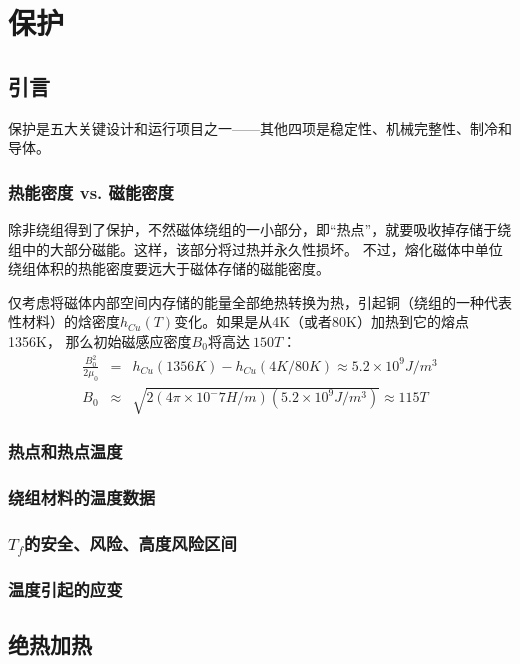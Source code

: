 \chapter{保护}
\section{引言}
保护是五大关键设计和运行项目之一——其他四项是稳定性、机械完整性、制冷和导体。
\subsection{热能密度 vs. 磁能密度}
除非绕组得到了保护，不然磁体绕组的一小部分，即“热点”，就要吸收掉存储于绕组中的大部分磁能。这样，该部分将过热并永久性损坏。
不过，熔化磁体中单位绕组体积的热能密度要远大于磁体存储的磁能密度。

仅考虑将磁体内部空间内存储的能量全部绝热转换为热，引起铜（绕组的一种代表性材料）的焓密度$h_{Cu}(T)$变化。如果是从4K（或者80K）加热到它的熔点1356K，
那么初始磁感应密度$B_0$将高达$~150 T$：
\begin{eqnarray}\label{eqn: 8.1}
  \frac{B_0^2}{2\mu_0}&=& h_{Cu}(1356K)-h_{Cu}(4K/80K)\approx 5.2\times 10^9 J/m^3 \nonumber\\
  B_0 &\approx
   &\sqrt{2(4\pi \times 10^-7 H/m)(5.2\times 10^9 J/m^3)}\approx 115 T
\end{eqnarray}

\subsection{热点和热点温度}

\subsection{绕组材料的温度数据}

\subsection{$T_f$的安全、风险、高度风险区间}

\subsection{温度引起的应变}


\section{绝热加热}
